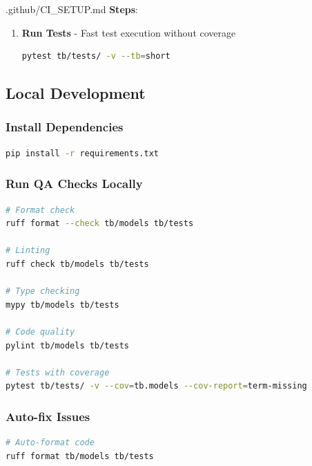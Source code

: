 \begin{relocated}{.github/CI_SETUP.md}
\textbf{Steps}:

\begin{enumerate}
\def\labelenumi{\arabic{enumi}.}
\item
  \textbf{Run Tests} - Fast test execution without coverage

  \begin{lstlisting}[language=bash]
  pytest tb/tests/ -v --tb=short
  \end{lstlisting}
\end{enumerate}

\subsection{Local Development}\label{um:flow:ci-setup:local-development}

\subsubsection{Install Dependencies}\label{um:flow:ci-setup:install-dependencies}

\begin{lstlisting}[language=bash]
pip install -r requirements.txt
\end{lstlisting}

\subsubsection{Run QA Checks Locally}\label{um:flow:ci-setup:run-qa-checks-locally}

\begin{lstlisting}[language=bash]
# Format check
ruff format --check tb/models tb/tests

# Linting
ruff check tb/models tb/tests

# Type checking
mypy tb/models tb/tests

# Code quality
pylint tb/models tb/tests

# Tests with coverage
pytest tb/tests/ -v --cov=tb.models --cov-report=term-missing
\end{lstlisting}

\subsubsection{Auto-fix Issues}\label{um:flow:ci-setup:auto-fix-issues}

\begin{lstlisting}[language=bash]
# Auto-format code
ruff format tb/models tb/tests


\end{lstlisting}
\end{relocated}
